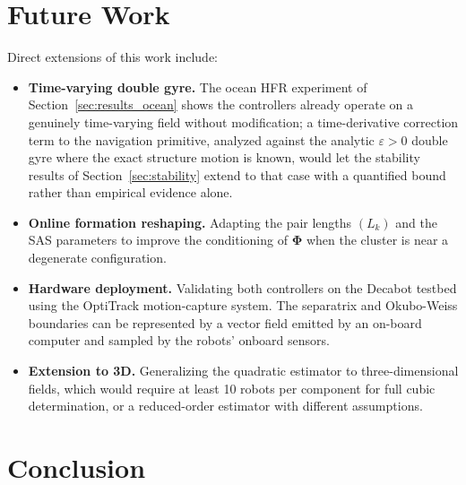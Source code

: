 \documentclass[lettersize,journal]{IEEEtran}
\begin{document}
\section{Future Work}
\label{sec:future}

Direct extensions of this work include:
\begin{itemize}
    \item \textbf{Time-varying double gyre.} The ocean HFR experiment of
          Section~\ref{sec:results_ocean} shows the controllers already
          operate on a genuinely time-varying field without modification;
          a time-derivative correction term to the navigation primitive,
          analyzed against the analytic $\varepsilon > 0$ double gyre where
          the exact structure motion is known, would let the stability
          results of Section~\ref{sec:stability} extend to that case with
          a quantified bound rather than empirical evidence alone.
    \item \textbf{Online formation reshaping.} Adapting the pair lengths
          $(L_k)$ and the SAS parameters to improve the conditioning of
          $\boldsymbol{\Phi}$ when the cluster is near a degenerate
          configuration.
    \item \textbf{Hardware deployment.} Validating both controllers on the
          Decabot testbed using the OptiTrack motion-capture system. The
          separatrix and Okubo-Weiss boundaries can be represented by a
          vector field emitted by an on-board computer and sampled by
          the robots' onboard sensors.
    \item \textbf{Extension to 3D.} Generalizing the quadratic estimator
          to three-dimensional fields, which would require at least 10 robots
          per component for full cubic determination, or a reduced-order
          estimator with different assumptions.
\end{itemize}


\section{Conclusion}
\label{sec:conclusion}
\end{document}
